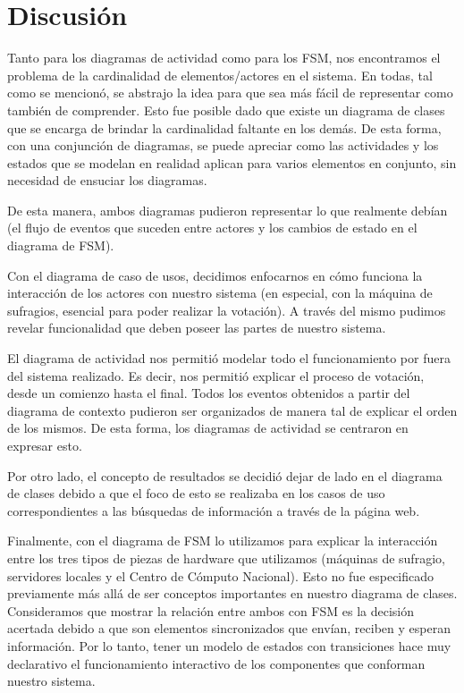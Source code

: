 \documentclass[spanish, 10pt,a4paper]{article}
\numberwithin{equation}{section} %
\begin{document}
\section{Discusión}

Tanto para los diagramas de actividad como para los FSM, nos encontramos el problema de la cardinalidad de elementos/actores en el sistema. En todas, tal como se mencionó, se abstrajo la idea para que sea más fácil de representar como también de comprender. Esto fue posible dado que existe un diagrama de clases que se encarga de brindar la cardinalidad faltante en los demás. De esta forma, con una conjunción de diagramas, se puede apreciar como las actividades y los estados que se modelan en realidad aplican para varios elementos en conjunto, sin necesidad de ensuciar los diagramas. 
\par
 De esta manera, ambos diagramas pudieron representar lo que realmente debían (el flujo de eventos que suceden entre actores y los cambios de estado en el diagrama de FSM).
\par 
Con el diagrama de caso de usos, decidimos enfocarnos en cómo funciona la interacción de los actores con nuestro sistema (en especial, con la máquina de sufragios, esencial para poder realizar la votación). A través del mismo pudimos revelar funcionalidad que deben poseer las partes de nuestro sistema.
\par 
El diagrama de actividad nos permitió modelar todo el funcionamiento por fuera del sistema realizado. Es decir, nos permitió explicar el proceso de votación, desde un comienzo hasta el final. Todos los eventos obtenidos a partir del diagrama de contexto pudieron ser organizados de manera tal de explicar el orden de los mismos. De esta forma, los diagramas de actividad se centraron en expresar esto.
\par 
Por otro lado, el concepto de resultados se decidió dejar de lado en el diagrama de clases debido a que el foco de esto se realizaba en los casos de uso correspondientes a las búsquedas de información a través de la página web. 
\par 
Finalmente, con el diagrama de FSM lo utilizamos para explicar la interacción entre los tres tipos de piezas de hardware que utilizamos (máquinas de sufragio, servidores locales y el Centro de Cómputo Nacional). Esto no fue especificado previamente más allá de ser conceptos importantes en nuestro diagrama de clases. Consideramos que mostrar la relación entre ambos con FSM es la decisión acertada debido a que son elementos sincronizados que envían, reciben y esperan información. Por lo tanto, tener un modelo de estados con transiciones hace muy declarativo el funcionamiento interactivo de los componentes que conforman nuestro sistema.
	
\end{document}
